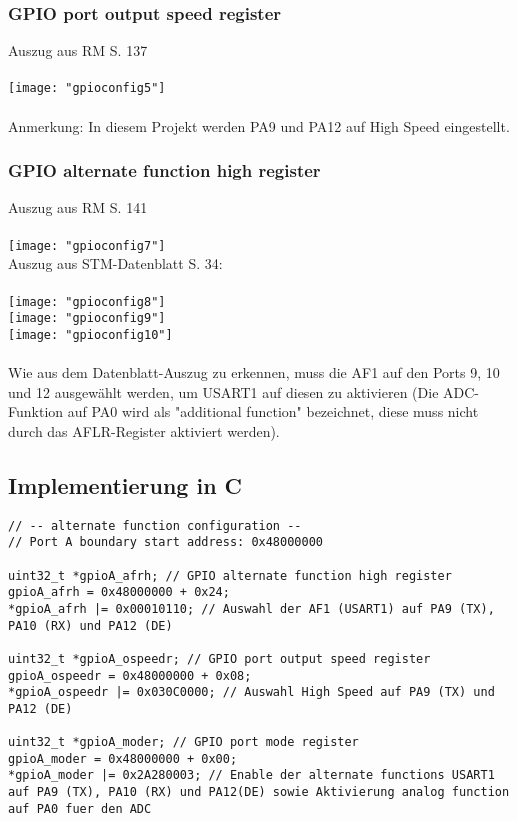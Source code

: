 \documentclass[11pt]{report}
\begin{document}
			\subsubsection{GPIO port output speed register}
				Auszug aus RM S. 137\\
				\\\texttt{[image: "gpioconfig5"]}\\
				\\Anmerkung: In diesem Projekt werden PA9 und PA12 auf High Speed eingestellt.
			\subsubsection{GPIO alternate function high register}
				Auszug aus RM S. 141\\
				\\\texttt{[image: "gpioconfig7"]}\\
				Auszug aus STM-Datenblatt S. 34:\\
				\\\texttt{[image: "gpioconfig8"]}\\
				\texttt{[image: "gpioconfig9"]}\\
				\texttt{[image: "gpioconfig10"]}\\
				\\Wie aus dem Datenblatt-Auszug zu erkennen, muss die AF1 auf den Ports 9, 10 und 12 ausgewählt werden, um USART1 auf diesen zu aktivieren (Die ADC-Funktion auf PA0 wird als "additional function" bezeichnet, diese muss nicht durch das AFLR-Register aktiviert werden).
		\subsection{Implementierung in C}
			\begin{lstlisting}
// -- alternate function configuration --
// Port A boundary start address: 0x48000000

uint32_t *gpioA_afrh; // GPIO alternate function high register
gpioA_afrh = 0x48000000 + 0x24;
*gpioA_afrh |= 0x00010110; // Auswahl der AF1 (USART1) auf PA9 (TX), PA10 (RX) und PA12 (DE)

uint32_t *gpioA_ospeedr; // GPIO port output speed register
gpioA_ospeedr = 0x48000000 + 0x08;
*gpioA_ospeedr |= 0x030C0000; // Auswahl High Speed auf PA9 (TX) und PA12 (DE)

uint32_t *gpioA_moder; // GPIO port mode register
gpioA_moder = 0x48000000 + 0x00;
*gpioA_moder |= 0x2A280003; // Enable der alternate functions USART1 auf PA9 (TX), PA10 (RX) und PA12(DE) sowie Aktivierung analog function auf PA0 fuer den ADC
			\end{lstlisting}
\end{document}
